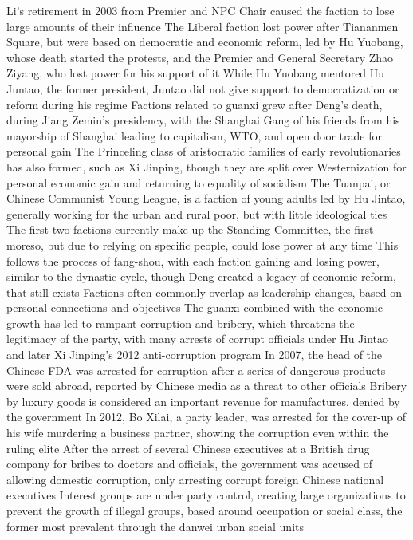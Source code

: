 \documentclass[11 pt, twoside]{article}
\newenvironment{outline*}
{
	\begin{outline}[enumerate]
	}
	{\end{outline}
}
\begin{document}
\begin{outline*}
\3 Li's retirement in 2003 from Premier and NPC Chair caused the faction to lose large amounts of their influence
\3 The Liberal faction lost power after Tiananmen Square, but were based on democratic and economic reform, led by Hu Yuobang, whose death started the protests, and the Premier and General Secretary Zhao Ziyang, who lost power for his support of it
\4 While Hu Yuobang mentored Hu Juntao, the former president, Juntao did not give support to democratization or reform during his regime
\2 Factions related to guanxi grew after Deng's death, during Jiang Zemin's presidency, with the Shanghai Gang of his friends from his mayorship of Shanghai leading to capitalism, WTO, and open door trade for personal gain
\3 The Princeling class of aristocratic families of early revolutionaries has also formed, such as Xi Jinping, though they are split over Westernization for personal economic gain and returning to equality of socialism
\3 The Tuanpai, or Chinese Communist Young League, is a faction of young adults led by Hu Jintao, generally working for the urban and rural poor, but with little ideological ties
\3 The first two factions currently make up the Standing Committee, the first moreso, but due to relying on specific people, could lose power at any time
\4 This follows the process of fang-shou, with each faction gaining and losing power, similar to the dynastic cycle, though Deng created a legacy of economic reform, that still exists
\3 Factions often commonly overlap as leadership changes, based on personal connections and objectives
\2 The guanxi combined with the economic growth has led to rampant corruption and bribery, which threatens the legitimacy of the party, with many arrests of corrupt officials under Hu Jintao and later Xi Jinping's 2012 anti-corruption program
\3 In 2007, the head of the Chinese FDA was arrested for corruption after a series of dangerous products were sold abroad, reported by Chinese media as a threat to other officials
\3 Bribery by luxury goods is considered an important revenue for manufactures, denied by the government
\3 In 2012, Bo Xilai, a party leader, was arrested for the cover-up of his wife murdering a business partner, showing the corruption even within the ruling elite
\3 After the arrest of several Chinese executives at a British drug company for bribes to doctors and officials, the government was accused of allowing domestic corruption, only arresting corrupt foreign Chinese national executives
\1 Interest groups are under party control, creating large organizations to prevent the growth of illegal groups, based around occupation or social class, the former most prevalent through the danwei urban social units

\end{outline*}
\end{document}
